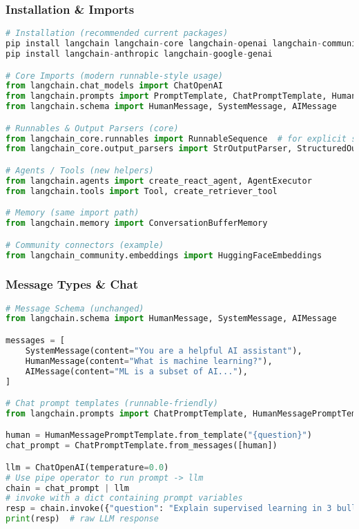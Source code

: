 \begin{frame}[fragile]\frametitle{Installation \& Imports}
\begin{lstlisting}[language=python,basicstyle=\tiny]
# Installation (recommended current packages)
pip install langchain langchain-core langchain-openai langchain-community
pip install langchain-anthropic langchain-google-genai

# Core Imports (modern runnable-style usage)
from langchain.chat_models import ChatOpenAI
from langchain.prompts import PromptTemplate, ChatPromptTemplate, HumanMessagePromptTemplate, SystemMessagePromptTemplate
from langchain.schema import HumanMessage, SystemMessage, AIMessage

# Runnables & Output Parsers (core)
from langchain_core.runnables import RunnableSequence  # for explicit sequences if needed
from langchain_core.output_parsers import StrOutputParser, StructuredOutputParser, PydanticOutputParser

# Agents / Tools (new helpers)
from langchain.agents import create_react_agent, AgentExecutor
from langchain.tools import Tool, create_retriever_tool

# Memory (same import path)
from langchain.memory import ConversationBufferMemory

# Community connectors (example)
from langchain_community.embeddings import HuggingFaceEmbeddings
\end{lstlisting}
\end{frame}

\begin{frame}[fragile]\frametitle{Message Types \& Chat}
\begin{lstlisting}[language=python,basicstyle=\tiny]
# Message Schema (unchanged)
from langchain.schema import HumanMessage, SystemMessage, AIMessage

messages = [
    SystemMessage(content="You are a helpful AI assistant"),
    HumanMessage(content="What is machine learning?"),
    AIMessage(content="ML is a subset of AI..."),
]

# Chat prompt templates (runnable-friendly)
from langchain.prompts import ChatPromptTemplate, HumanMessagePromptTemplate

human = HumanMessagePromptTemplate.from_template("{question}")
chat_prompt = ChatPromptTemplate.from_messages([human])

llm = ChatOpenAI(temperature=0.0)
# Use pipe operator to run prompt -> llm
chain = chat_prompt | llm
# invoke with a dict containing prompt variables
resp = chain.invoke({"question": "Explain supervised learning in 3 bullets."})
print(resp)  # raw LLM response
\end{lstlisting}
\end{frame}

